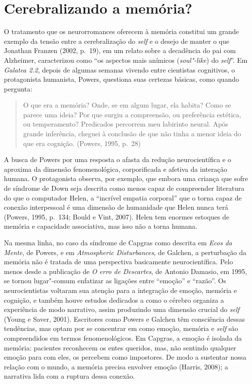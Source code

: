\section{Cerebralizando a memória?}

O tratamento que os neurorromances oferecem à memória constitui um
grande exemplo da tensão entre a cerebralização do \emph{self} e o desejo de
manter o que Jonathan Franzen (2002, p.~19), em um relato sobre a
decadência do pai com Alzheimer, caracterizou como ``os aspectos mais
anímicos (\emph{soul"-like}) do \emph{self}''. Em \emph{Galatea 2.2}, depois de
algumas semanas vivendo entre cientistas cognitivos, o protagonista
humanista, Powers, questiona suas certezas básicas, como quando
pergunta:

\begin{quote}
O que era a memória? Onde, se em algum lugar, ela habita? Como se parece
uma ideia? Por que surgiu a compreensão, ou preferência estética, ou
temperamento? Predicados percorrem meu labirinto neural. Após grande
inferência, cheguei à conclusão de que não tinha a menor ideia do que
era cognição. (Powers, 1995, p.~28)
\end{quote}

A busca de Powers por uma resposta o afasta da redução neurocientífica e
o aproxima da dimensão fenomenológica, corporificada e afetiva da
interação humana. O protagonista observa, por exemplo, que embora uma
criança que sofre de síndrome de Down seja descrita como menos capaz de
compreender literatura do que o computador Helen, a ``incrível empatia
corporal'' que o torna capaz de conexão interpessoal é uma dimensão de
humanidade que Helen nunca terá (Powers, 1995, p.~134; Bould e Vint,
2007). Helen tem enormes estoques de memória e capacidade associativa,
mas isso não a torna humana.

Na mesma linha, no caso da síndrome de Capgras como descrita em
\emph{Ecos da Mente}, de Powers, e em \emph{Atmospheric Disturbances},
de Galchen, a perturbação da memória não é tratada de uma perspectiva
basicamente neurocientífica. Pelo menos desde a publicação de \emph{O
erro de Descartes}, de Antonio Damasio, em 1995, se tornou lugar"-comum
enfatizar as ligações entre ``emoção'' e ``razão''. Os neurocientistas
voltaram sua atenção para a integração de emoção, memória e cognição, e
também houve estudos dedicados a como o cérebro organiza a experiência
de modo narrativo, assim produzindo uma dimensão crucial do \emph{self}
(Young e Saver, 2001). Escritores como Powers e Galchen têm consciência
dessas tendências, mas optam por se concentrar em como emoção, memória e
\emph{self} são compreendidos em termos fenomenológicos. Em Capgras, a emoção é
isolada da memória: pacientes reconhecem os entes queridos, mas, não
sentindo qualquer emoção para com eles, os percebem como impostores. De
modo a sustentar nossa relação com o mundo, a memória precisa envolver
emoção (Harris, 2008); a narrativa lida com a ruptura dessa conexão.

